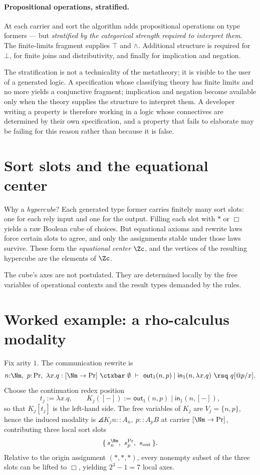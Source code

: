 \paragraph{Propositional operations, stratified.} At each carrier and sort the algorithm
adds propositional operations on type formers --- but \emph{stratified by the categorical
strength required to interpret them}. The finite-limits fragment supplies $\top$ and
$\wedge$. Additional structure is required for $\bot$, for finite joins and
distributivity, and finally for implication and negation.

\begin{remark}
\label{ob:rem:stratification}
The stratification is not a technicality of the metatheory; it is visible to the user of
a generated logic. A specification whose classifying theory has finite limits and no more
yields a conjunctive fragment; implication and negation become available only when the
theory supplies the structure to interpret them. A developer writing a property is
therefore working in a logic whose connectives are determined by their own specification,
and a property that fails to elaborate may be failing for this reason rather than because
it is false.
\end{remark}

\section{Sort slots and the equational center}

Why a \emph{hypercube}? Each generated type former carries finitely many sort slots: one
for each rely input and one for the output. Filling each slot with $\ast$ or $\Box$ yields
a raw Boolean cube of choices. But equational axioms and rewrite laws force certain slots
to agree, and only the assignments stable under those laws survive. These form the
\emph{equational center} $\Zc$, and the vertices of the resulting hypercube are the
elements of $\Zc$.

The cube's axes are not postulated. They are determined locally by the free variables of
operational contexts and the result types demanded by the rules.

\section{Worked example: a rho-calculus modality}
\label{ob:subsec:rho-modality}

Fix arity $1$. The communication rewrite is
\[
  n{:}\Nm,\ p{:}\Pr,\ \lambda x.q : [\Nm \to \Pr] \ \ctxbar\ \emptyset \ \vdash\
  \mathsf{out}_1(n,p) \mid \mathsf{in}_1(n, \lambda x.q) \ \rsq\ q[@p/x] .
\]
Choose the continuation redex position
\[
  t_j := \lambda x.q, \qquad K_j([-]) := \mathsf{out}_1(n,p) \mid \mathsf{in}_1(n,[-]) ,
\]
so that $K_j[t_j]$ is the left-hand side. The free variables of $K_j$ are
$V_j = \{n,p\}$, hence the induced modality is $\angles{K_j}{n :: A_n,\ p :: A_p}{B}$ at
carrier $[\Nm \to \Pr]$, contributing three local sort slots
\[
  \{\, s_n^{\Nm},\ s_p^{\Pr},\ s_{\mathrm{out}} \,\} .
\]
Relative to the origin assignment $(\ast,\ast,\ast)$, every nonempty subset of the three
slots can be lifted to $\Box$, yielding $2^3 - 1 = 7$ local axes.

